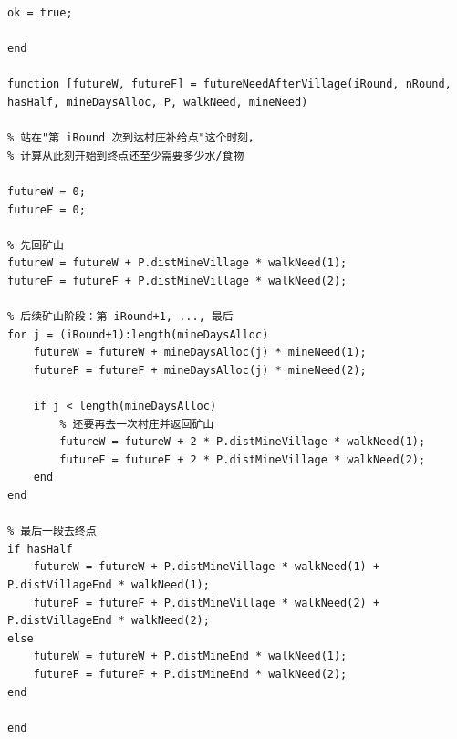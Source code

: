 \begin{verbatim}
ok = true;

end

function [futureW, futureF] = futureNeedAfterVillage(iRound, nRound, hasHalf, mineDaysAlloc, P, walkNeed, mineNeed)

% 站在"第 iRound 次到达村庄补给点"这个时刻，
% 计算从此刻开始到终点还至少需要多少水/食物

futureW = 0;
futureF = 0;

% 先回矿山
futureW = futureW + P.distMineVillage * walkNeed(1);
futureF = futureF + P.distMineVillage * walkNeed(2);

% 后续矿山阶段：第 iRound+1, ..., 最后
for j = (iRound+1):length(mineDaysAlloc)
    futureW = futureW + mineDaysAlloc(j) * mineNeed(1);
    futureF = futureF + mineDaysAlloc(j) * mineNeed(2);

    if j < length(mineDaysAlloc)
        % 还要再去一次村庄并返回矿山
        futureW = futureW + 2 * P.distMineVillage * walkNeed(1);
        futureF = futureF + 2 * P.distMineVillage * walkNeed(2);
    end
end

% 最后一段去终点
if hasHalf
    futureW = futureW + P.distMineVillage * walkNeed(1) + P.distVillageEnd * walkNeed(1);
    futureF = futureF + P.distMineVillage * walkNeed(2) + P.distVillageEnd * walkNeed(2);
else
    futureW = futureW + P.distMineEnd * walkNeed(1);
    futureF = futureF + P.distMineEnd * walkNeed(2);
end

end
\end{verbatim}